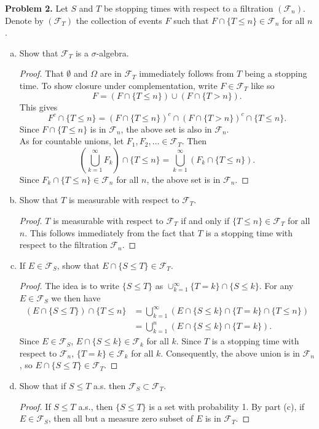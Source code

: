 \documentclass[11pt,letterpaper]{report}
\newcommand{\mcal}[1]{\mathcal{#1}}
\begin{document}
\noindent\textbf{Problem 2. }
Let $S$ and $T$ be stopping times with respect to a filtration $(\mcal{F}_n)$. Denote by $(\mcal{F}_T)$ the collection of events $F$ such that $F\cap \{T\leq n\} \in \mcal{F}_n$ for all $n$.
\begin{enumerate}[(a)]
	\item Show that $\mcal{F}_T$ is a $\sigma$-algebra.
	\begin{proof}
		That $\emptyset$ and $\Omega$ are in $\mcal{F}_T$ immediately follows from $T$ being a stopping time. To show closure under complementation, write $F\in \mcal{F}_T$ like so
		\[
		F = (F\cap \{T\leq n\})\cup (F\cap \{T>n\}).
		\]
		This gives
		\[
		F^c\cap \{T\leq n\} = (F\cap \{T\leq n\})^c\cap (F\cap \{T>n\})^c\cap \{T\leq n\}.
		\]
		Since $F\cap \{T\leq n\}$ is in $\mcal{F}_n$, the above set is also in $\mcal{F}_n$.\\

		\noindent As for countable unions, let $F_1, F_2, \ldots \in \mcal{F}_T$. Then
		\[
		\left(\bigcup_{k=1}^\infty F_k\right)\cap \{T\leq n\} = \bigcup_{k=1}^\infty (F_k\cap \{T\leq n\}).
		\]
		Since $F_k\cap \{T\leq n\}\in \mcal{F}_n$ for all $n$, the above set is in $\mcal{F}_n$.
	\end{proof}

	\item Show that $T$ is measurable with respect to $\mcal{F}_T$.
	\begin{proof}
		$T$ is measurable with respect to $\mcal{F}_T$ if and only if $\{T\leq n\}\in \mcal{F}_T$ for all $n$. This follows immediately from the fact that $T$ is a stopping time with respect to the filtration $\mcal{F}_n$. 
	\end{proof}

	\item If $E\in \mcal{F}_S$, show that $E\cap \{S\leq T\}\in \mcal{F}_T$.
	\begin{proof}
		The idea is to write $\{S\leq T\}$ as $\cup_{k=1}^\infty \{T = k\}\cap \{S\leq k\}$. For any $E\in \mcal{F}_S$ we then have
		\begin{align*}
		(E\cap \{S\leq T\})\cap \{T\leq n\} &= \bigcup_{k=1}^\infty( E\cap \{S\leq k\}\cap \{T = k\}\cap\{T\leq n\} )\\
		&= \bigcup_{k=1}^n(E\cap \{S\leq k\}\cap \{T = k\}).
		\end{align*}
		Since $E\in \mcal{F}_S$, $E\cap \{S\leq k\}\in \mcal{F}_k$ for all $k$. Since $T$ is a stopping time with respect to $\mcal{F}_n$, $\{T = k\}\in \mcal{F}_k$ for all $k$. Consequently, the above union is in $\mcal{F}_n$, so $E\cap \{S\leq T\}\in \mcal{F}_T$.
	\end{proof}

	\item Show that if $S\leq T$ a.s. then $\mcal{F}_S\subset \mcal{F}_T$.
	\begin{proof}
		If $S\leq T$ a.s., then $\{S\leq T\}$ is a set with probability 1. By part (c), if $E\in \mcal{F}_S$, then all but a measure zero subset of $E$ is in $\mcal{F}_T$.
	\end{proof}
\end{enumerate}
\end{document}
